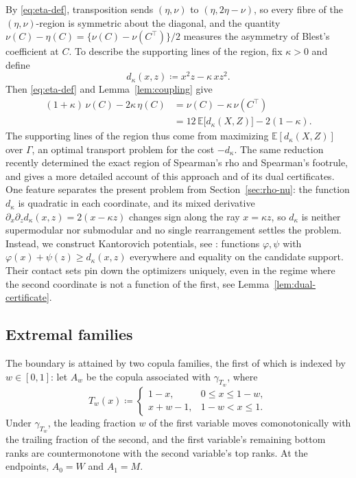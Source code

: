 \documentclass[11pt,a4paper]{article}
\theoremstyle{remark}
\newcommand{\E}{\mathbb{E}}
\newcommand{\1}{\mathbf{1}}
\newcommand{\Gam}{\Gamma}
\begin{document}
By \eqref{eq:eta-def}, transposition sends $(\eta,\nu)$ to $(\eta,2\eta-\nu)$, so every fibre of the $(\eta,\nu)$-region is symmetric about the diagonal, and the quantity $\nu(C)-\eta(C)=\{\nu(C)-\nu(C^\top)\}/2$ measures the asymmetry of Blest's coefficient at $C$.
To describe the supporting lines of the region, fix $\kappa>0$ and define
\[
  d_\kappa(x,z)\coloneqq x^2z-\kappa\,xz^2.
\]
Then \eqref{eq:eta-def} and Lemma~\ref{lem:coupling} give
\begin{equation}
  \label{eq:eta-nu-support}
  \begin{aligned}
  (1+\kappa)\,\nu(C)-2\kappa\,\eta(C)
  &=\nu(C)-\kappa\,\nu(C^\top)\\
  &=12\,\E\bigl[d_\kappa(X,Z)\bigr]-2(1-\kappa).
  \end{aligned}
\end{equation}
The supporting lines of the region thus come from maximizing $\E[d_\kappa(X,Z)]$ over $\Gam$, an optimal transport problem for the cost $-d_\kappa$.
The same reduction recently determined the exact region of Spearman's rho and Spearman's footrule, and \cite{ansari2026rhofootrule} gives a more detailed account of this approach and of its dual certificates.
One feature separates the present problem from Section~\ref{sec:rho-nu}: the function $d_\kappa$ is quadratic in each coordinate, and its mixed derivative $\partial_x\partial_zd_\kappa(x,z)=2(x-\kappa z)$ changes sign along the ray $x=\kappa z$, so $d_\kappa$ is neither supermodular nor submodular and no single rearrangement settles the problem.
Instead, we construct Kantorovich potentials, see \cite[Ch.~5]{villani2009optimal}: functions $\varphi,\psi$ with $\varphi(x)+\psi(z)\ge d_\kappa(x,z)$ everywhere and equality on the candidate support.
Their contact sets pin down the optimizers uniquely, even in the regime where the second coordinate is not a function of the first, see Lemma~\ref{lem:dual-certificate}.

\subsection{Extremal families}
\label{sec:eta-families}

The boundary is attained by two copula families, the first of which is indexed by $w\in[0,1]$: let $A_w$ be the copula associated with $\gamma_{T_w}$, where
\begin{equation}
  \label{eq:Tw-def}
  T_w(x)\coloneqq
  \begin{cases}
    1-x, & 0\le x\le1-w,\\
    x+w-1, & 1-w<x\le1.
  \end{cases}
\end{equation}
Under $\gamma_{T_w}$, the leading fraction $w$ of the first variable moves comonotonically with the trailing fraction of the second, and the first variable's remaining bottom ranks are countermonotone with the second variable's top ranks.
At the endpoints, $A_0=W$ and $A_1=M$.
\end{document}
